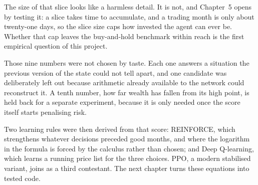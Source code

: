 The size of that slice looks like a harmless detail. It is not, and
Chapter~5 opens by testing it: a slice takes time to accumulate, and a
trading month is only about twenty-one days, so the slice size caps how
invested the agent can ever be. Whether that cap leaves the buy-and-hold
benchmark within reach is the first empirical question of this project.

Those nine numbers were not chosen by taste. Each one answers a situation
the previous version of the state could not tell apart, and one candidate
was deliberately left out because arithmetic already available to the
network could reconstruct it. A tenth number, how far wealth has fallen
from its high point, is held back for a separate experiment, because it is
only needed once the score itself starts penalising risk.

Two learning rules were then derived from that score: REINFORCE, which
strengthens whatever decisions preceded good months, and where the
logarithm in the formula is forced by the calculus rather than chosen; and
Deep Q-learning, which learns a running price list for the three choices.
PPO, a modern stabilised variant, joins as a third contestant. The next
chapter turns these equations into tested code.
